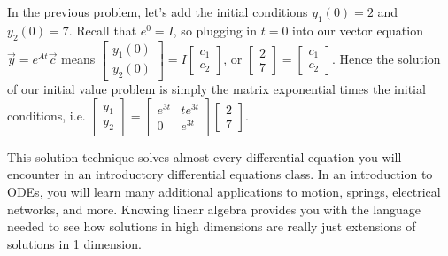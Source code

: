 \documentclass[10pt]{article}
\theoremstyle{plain}
\theoremstyle{box}
\begin{document}
In the previous problem, let's add the initial conditions $y_1(0)=2$ and $y_2(0)=7$. Recall that $e^0=I$, so plugging in $t=0$ into our vector equation $\vec y = e^{At}\vec c$ means 
$
\begin{bmatrix}
y_1(0)\\
y_2(0)
\end{bmatrix}
=I
\begin{bmatrix}
c_1\\
c_2
\end{bmatrix}
$, or 
$
\begin{bmatrix}
2\\
7
\end{bmatrix}
=
\begin{bmatrix}
c_1\\
c_2
\end{bmatrix}
$. Hence the solution of our initial value problem is simply the matrix exponential times the initial conditions, i.e.
$
\begin{bmatrix}
y_1\\
y_2
\end{bmatrix}
=
\begin{bmatrix}
e^{3t}&te^{3t}\\
0&e^{3t}
\end{bmatrix}
\begin{bmatrix}
2\\
7
\end{bmatrix}
$.

This solution technique solves almost every differential equation you will encounter in an introductory differential equations class. In an introduction to ODEs, you will learn many additional applications to motion, springs, electrical networks, and more. Knowing linear algebra provides you with the language needed to see how solutions in high dimensions are really just extensions of solutions in 1 dimension.
\end{document}
